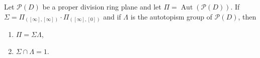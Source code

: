 Let $\mathcal{P}(D)$ be a proper division ring plane and let $\Pi = \operatorname{Aut}(\mathcal{P}(D))$. If $\Sigma = \Pi_{([\infty], [\infty])} \cdot \Pi_{([\infty], [0])}$ and if $\Lambda$ is the autotopism group of $\mathcal{P}(D)$, then
\begin{enumerate}
\item[(i)] $\Pi = \Sigma \Lambda$,
\item[(ii)] $\Sigma \cap \Lambda = 1$.
\end{enumerate}
